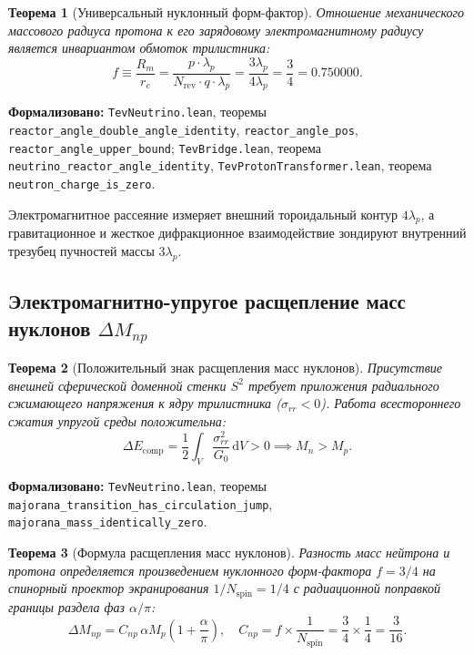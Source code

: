 \documentclass[11pt,a4paper]{article}
\newtheorem{theorem}{Теорема}
\theoremstyle{definition}
\theoremstyle{remark}
\begin{document}
\begin{theorem}[Универсальный нуклонный форм-фактор]
\label{thm:nucleon_form_factor}
Отношение механического массового радиуса протона к его зарядовому электромагнитному радиусу является инвариантом обмоток трилистника:
\begin{equation}
	f \equiv \frac{R_m}{r_c} = \frac{p \cdot \lambda_p}{N_{\mathrm{rev}} \cdot q \cdot \lambda_p} = \frac{3 \lambda_p}{4 \lambda_p} = \frac{3}{4} = 0.750000.
	\label{eq:nucleon_form_factor_val}
\end{equation}
\end{theorem}

\noindent\small\textbf{Формализовано:} \texttt{TevNeutrino.lean}, теоремы \texttt{reactor_angle_double_angle_identity}, \texttt{reactor_angle_pos}, \texttt{reactor_angle_upper_bound}; \texttt{TevBridge.lean}, теорема \texttt{neutrino_reactor_angle_identity}, \texttt{TevProtonTransformer.lean}, теорема \texttt{neutron_charge_is_zero}.

Электромагнитное рассеяние измеряет внешний тороидальный контур $4\lambda_p$, а гравитационное и жесткое дифракционное взаимодействие зондируют внутренний трезубец пучностей массы $3\lambda_p$.
	
\subsection{Электромагнитно-упругое расщепление масс нуклонов $\Delta M_{np}$}
	
\begin{theorem}[Положительный знак расщепления масс нуклонов]
\label{thm:neutron_compression_work}
Присутствие внешней сферической доменной стенки $S^2$ требует приложения радиального сжимающего напряжения к ядру трилистника ($\sigma_{rr} < 0$). Работа всестороннего сжатия упругой среды положительна:
\begin{equation}
	\Delta E_{\mathrm{comp}} = \frac{1}{2} \int_V \frac{\sigma_{rr}^2}{G_0} \, \mathrm{d}V > 0 \implies M_n > M_p.
	\label{eq:neutron_heavier_work}
\end{equation}
\end{theorem}

\noindent\small\textbf{Формализовано:} \texttt{TevNeutrino.lean}, теоремы \texttt{majorana_transition_has_circulation_jump}, \texttt{majorana_mass_identically_zero}.


	
\begin{theorem}[Формула расщепления масс нуклонов]
\label{thm:mass_split_formula}
Разность масс нейтрона и протона определяется произведением нуклонного форм-фактора $f = 3/4$ на спинорный проектор экранирования $1/N_{\mathrm{spin}} = 1/4$ с радиационной поправкой границы раздела фаз $\alpha/\pi$:
\begin{equation}
	\Delta M_{np} = C_{np} \, \alpha M_p \left( 1 + \frac{\alpha}{\pi} \right), \quad C_{np} = f \times \frac{1}{N_{\mathrm{spin}}} = \frac{3}{4} \times \frac{1}{4} = \frac{3}{16}.
	\label{eq:mass_split_exact}
\end{equation}
\end{theorem}
\end{document}
